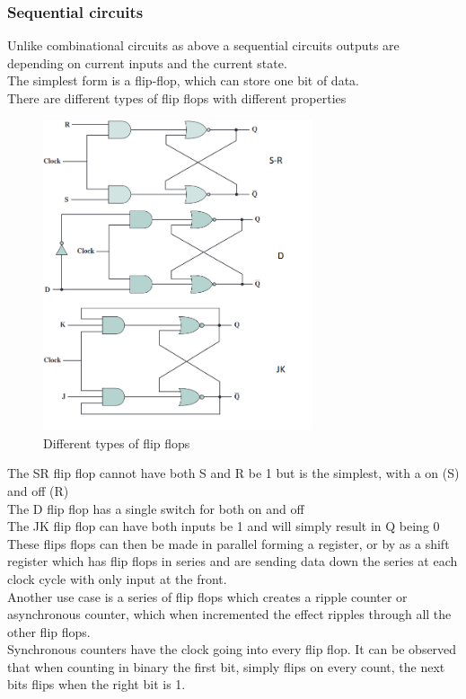 \documentclass[12pt, a4paper]{article}
\begin{document}
				\subsubsection{Sequential circuits}
					Unlike combinational circuits as above a sequential circuits outputs are depending on current inputs and the current state.\\
					The simplest form is a flip-flop, which can store one bit of data.\\
					There are different types of flip flops with different properties
					\begin{figure}[h!]
						\includegraphics[width=300px]{assets/flipFlops.png}
						\centering
						\caption{Different types of flip flops}
					\end{figure}
					The SR flip flop cannot have both S and R be 1 but is the simplest, with a on (S) and off (R)\\
					The D flip flop has a single switch for both on and off\\
					The JK flip flop can have both inputs be 1 and will simply result in Q being 0\\
					These flips flops can then be made in parallel forming a register, or by as a shift register which has flip flops in series and are sending data down the series at each clock cycle with only input at the front.\\
					Another use case is a series of flip flops which creates a ripple counter or asynchronous counter, which when incremented the effect ripples through all the other flip flops.\\
					Synchronous counters have the clock going into every flip flop. It can be observed that when counting in binary the first bit, simply flips on every count, the next bits flips when the right bit is 1.\\
\end{document}
